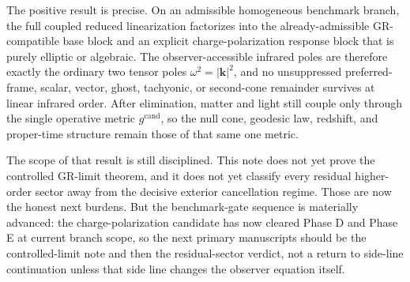 \documentclass[11pt]{article}
\newcommand{\CandidateMetric}{g^{\mathrm{cand}}}
\begin{document}
The positive result is precise. On an admissible homogeneous benchmark branch, the full coupled reduced linearization factorizes into the already-admissible GR-compatible base block and an explicit charge-polarization response block that is purely elliptic or algebraic. The observer-accessible infrared poles are therefore exactly the ordinary two tensor poles \(\omega^2=|\mathbf{k}|^2\), and no unsuppressed preferred-frame, scalar, vector, ghost, tachyonic, or second-cone remainder survives at linear infrared order. After elimination, matter and light still couple only through the single operative metric \(\CandidateMetric\), so the null cone, geodesic law, redshift, and proper-time structure remain those of that same one metric.

The scope of that result is still disciplined. This note does not yet prove the controlled GR-limit theorem, and it does not yet classify every residual higher-order sector away from the decisive exterior cancellation regime. Those are now the honest next burdens. But the benchmark-gate sequence is materially advanced: the charge-polarization candidate has now cleared Phase D and Phase E at current branch scope, so the next primary manuscripts should be the controlled-limit note and then the residual-sector verdict, not a return to side-line continuation unless that side line changes the observer equation itself.
\end{document}
